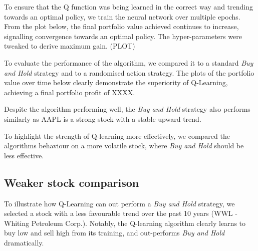 \documentclass[12pt]{article}
\begin{document}
To ensure that the Q function was being learned in the correct way and trending towards an optimal policy, we train the neural network over multiple epochs. From the plot below, the final portfolio value achieved continues to increase, signalling convergence towards an optimal policy. The hyper-parameters were tweaked to derive maximum gain. (PLOT)

To evaluate the performance of the algorithm, we compared it to a standard \textit{Buy and Hold} strategy and to a randomised action strategy. The plots of the portfolio value over time below clearly demonstrate the superiority of Q-Learning, achieving a final portfolio profit of XXXX.

Despite the algorithm performing well, the \textit{Buy and Hold} strategy also performs similarly as AAPL is a strong stock with a stable upward trend.

To highlight the strength of Q-learning more effectively, we compared the algorithms behaviour on a more volatile stock, where \textit{Buy and Hold} should be less effective.

\subsection{Weaker stock comparison}

To illustrate how Q-Learning can out perform a \textit{Buy and Hold} strategy, we selected a stock with a less favourable trend over the past 10 years (WWL - Whiting Petroleum Corp.). Notably, the Q-learning algorithm clearly learns to buy low and sell high from its training, and out-performs \textit{Buy and Hold} dramatically.
\end{document}
